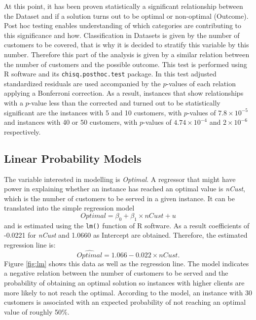 \documentclass[5p,times]{elsarticle}
\begin{document}
		At this point, it has been proven statistically a significant relationship between the Dataset and if a solution turns out to be optimal or non-optimal (Outcome). Post hoc testing enables understanding of which categories are contributing to this significance and how. Classification in Datasets is given by the number of customers to be covered, that is why it is decided to stratify this variable by this number. Therefore this part of the analysis is given by a similar relation between the number of customers and the possible outcome. This test is performed using R software and its \texttt{chisq.posthoc.test} package. In this test adjusted standardized residuals are used accompanied by the $p$-values of each relation applying a Bonferroni correction. As a result, instances that show relationships with a $p$-value less than the corrected and turned out to be statistically significant are the instances with 5 and 10 customers, with $p$-values of $7.8 \times 10^{-5}$ and instances with 40 or 50 customers, with $p$-values of $4.74 \times 10^{-4}$ and $2 \times 10^{-6}$ respectively.
	
	\subsection{Linear Probability Models}
	
		The variable interested in modelling is \textit{Optimal}. A regressor that might have power in explaining whether an instance has reached an optimal value is \textit{nCust}, which is the number of customers to be served in a given instance. It can be translated into the simple regression model \begin{equation}
			Optimal = \beta_{0} + \beta_{1}\times nCust + u
		\end{equation} and is estimated using the \texttt{lm()} function of R software. As a result coefficients of -0.0221 for \textit{nCust} and 1.0660 as Intercept are obtained. Therefore, the estimated regression line is: \begin{equation}
			\widehat{Optimal} = 1.066 - 0.022 \times nCust.
		\end{equation} Figure \ref{fig:lm} shows this data as well as the regression line. The model indicates a negative relation between the number of customers to be served and the probability of obtaining an optimal solution so instances with higher clients are more likely to not reach the optimal. According to the model, an instance with 30 customers is associated with an expected probability of not reaching an optimal value of roughly 50\%.
\end{document}
